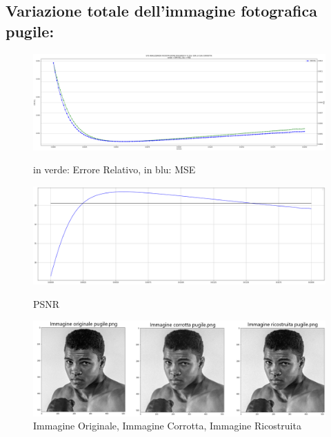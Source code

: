 \subsection{Variazione totale dell'immagine fotografica pugile:}
\begin{figure}[H]
    \centering
    \includegraphics[width=\textwidth]{IMMAGINI_RELAZIONE/graficoPugileTOTVAR_ERRREL&MSE.png}
    \caption{in verde: Errore Relativo, in blu: MSE}
    \includegraphics[width=\textwidth]{IMMAGINI_RELAZIONE/graficoPugileTOTVAR_PSNR&suaMedia.png}
    \caption{PSNR}
    \includegraphics[width=\textwidth]{imgRicostruzione/ricostruzionePugile_TOTVAR_maxPSNR33.70.png}
    \caption{Immagine Originale, Immagine Corrotta, Immagine Ricostruita}
\end{figure}

